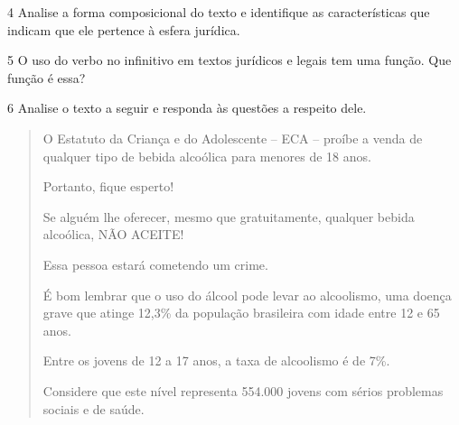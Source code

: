 
\num{4} Analise a forma composicional do texto e identifique as características que
indicam que ele pertence à esfera jurídica.


\num{5} O uso do verbo no infinitivo em textos jurídicos e legais tem uma função. 
Que função é essa?


\num{6} Analise o texto a seguir e responda às questões a respeito dele. 


\begin{quote}
O Estatuto da Criança e do Adolescente -- ECA -- proíbe a venda de
qualquer tipo de bebida alcoólica para menores de 18 anos.

Portanto, fique esperto!

Se alguém lhe oferecer, mesmo que gratuitamente, qualquer bebida
alcoólica, NÃO ACEITE!

Essa pessoa estará cometendo um crime.

É bom lembrar que o uso do álcool pode levar ao alcoolismo, uma doença
grave que atinge 12,3\% da população brasileira com idade entre 12 e 65
anos.

Entre os jovens de 12 a 17 anos, a taxa de alcoolismo é de 7\%.

Considere que este nível representa 554.000 jovens com sérios problemas
sociais e de saúde.

\end{quote}

